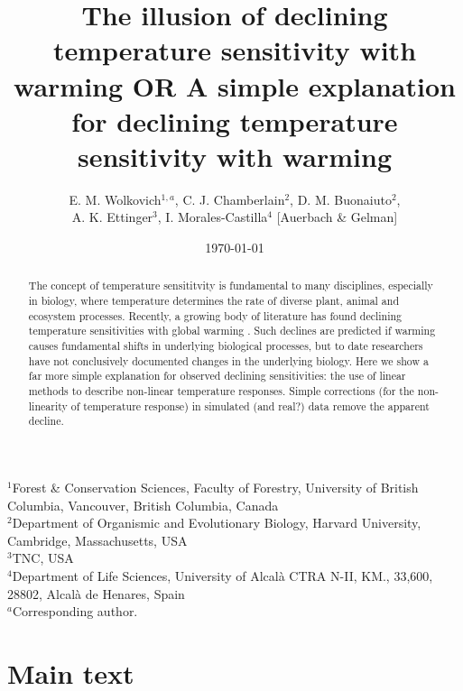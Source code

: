 \documentclass[11pt,letter]{article}
\begin{document}
% 

\title{The illusion of declining temperature sensitivity with warming OR A simple explanation for declining temperature sensitivity with warming} %
\author{E. M. Wolkovich$^{1,a}$, C. J. Chamberlain$^{2}$, D. M. Buonaiuto$^{2}$, \\ A. K. Ettinger$^3$, I. Morales-Castilla$^{4}$ [Auerbach \& Gelman]} %

\date{\today} 
\maketitle
$^1$Forest \& Conservation Sciences, Faculty of Forestry, University of British Columbia, Vancouver, British Columbia, Canada\\
$^2$Department of Organismic and Evolutionary Biology, Harvard University, Cambridge, Massachusetts, USA\\
$^3$TNC, USA\\
$^4$Department of Life Sciences, University of Alcal\`a CTRA N-II, KM., 33,600, 28802, Alcal\`a de Henares, Spain\\
$^a$Corresponding author.

\section{Main text}
\begin{abstract}
The concept of temperature sensititvity is fundamental to many disciplines, especially in biology, where temperature determines the rate of diverse plant, animal and ecosystem processes. Recently, a growing body of literature has found declining temperature sensitivities with global warming \citep{fu2015,gusewell2017,dai2019ag}. Such declines are predicted if warming causes fundamental shifts in underlying biological processes, but to date researchers have not conclusively documented changes in the underlying biology. Here we show a far more simple explanation for observed declining sensitivities: the use of linear methods to describe non-linear temperature responses. Simple corrections (for the non-linearity of temperature response) in simulated (and real?) data remove the apparent decline. 
\end{abstract}
\end{document}
